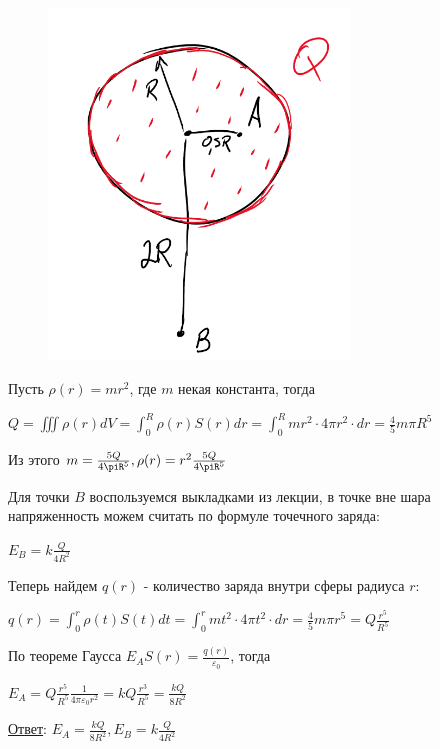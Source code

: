 \documentclass[12pt]{article}
\begin{document}
\begin{minipage}{\textwidth}
    \begin{figure}
        \includegraphics[width=8cm]{physics1/images/physics1_homework_6_4}
    \end{figure}

    Пусть $\rho(r) = mr^2$, где $m$ некая константа, тогда 

    $Q = \iiint \rho(r) dV = \int_0^R \rho(r) S(r) dr = \int_0^R mr^2 \cdot 4\pi r^2 \cdot dr = \frac{4}{5}m\pi R^5$

    Из этого $m = \frac{5Q}{4\piR^5}, \rho(r) = r^2\frac{5Q}{4\piR^5}$

    Для точки $B$ воспользуемся выкладками из лекции, в точке вне шара напряженность можем считать по формуле
    точечного заряда:

    $E_B = k\frac{Q}{4R^2}$

    Теперь найдем $q(r)$ - количество заряда внутри сферы радиуса $r$:

    $q(r) = \int_0^r \rho(t) S(t) dt = \int_0^r mt^2 \cdot 4\pi t^2 \cdot dr = \frac{4}{5}m\pi r^5 = Q\frac{r^5}{R^5}$

    По теореме Гаусса $E_A S(r) = \frac{q(r)}{\varepsilon_0}$, тогда 

    $E_A = Q\frac{r^5}{R^5} \frac{1}{4\pi\varepsilon_0 r^2} = kQ\frac{r^3}{R^5} = \frac{kQ}{8R^2}$

\end{minipage}

\underline{Ответ}: $E_A = \frac{kQ}{8R^2}, E_B = k\frac{Q}{4R^2}$


\clearpage

\end{document}
